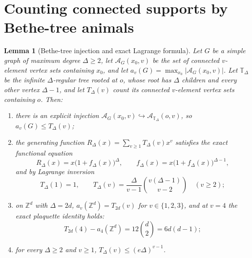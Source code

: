 \documentclass[11pt]{article}
\theoremstyle{plain}
\newtheorem{lemma}{Lemma}
\theoremstyle{definition}
\begin{document}
\section{Counting connected supports by Bethe-tree animals}\label{sec:animals}

\begin{lemma}[Bethe-tree injection and exact Lagrange formula]\label{lem:animals}
Let $G$ be a simple graph of maximum degree $\Delta\ge2$, let
$\mathcal A_G(x_0,v)$ be the set of connected $v$-element vertex sets containing
$x_0$, and let $a_v(G)=\max_{x_0}|\mathcal A_G(x_0,v)|$. Let $\mathbb T_\Delta$ be
the infinite $\Delta$-regular tree rooted at $o$, whose root has $\Delta$ children and
every other vertex $\Delta-1$, and let $T_\Delta(v)$ count its connected $v$-element
vertex sets containing $o$. Then:
\begin{enumerate}
\item there is an explicit injection $\mathcal A_G(x_0,v)\hookrightarrow
 \mathcal A_{\mathbb T_\Delta}(o,v)$, so $a_v(G)\le T_\Delta(v)$;
\item the generating function $R_\Delta(x)=\sum_{v\ge1}T_\Delta(v)x^v$ satisfies the
 exact functional equation
 \begin{equation}\label{eq:functional}
 R_\Delta(x)=x\bigl(1+f_\Delta(x)\bigr)^\Delta,\qquad
 f_\Delta(x)=x\bigl(1+f_\Delta(x)\bigr)^{\Delta-1},
 \end{equation}
 and by Lagrange inversion
\begin{equation}\label{eq:lagrange}
 T_\Delta(1)=1,\qquad T_\Delta(v)=\frac{\Delta}{v-1}\binom{v(\Delta-1)}{v-2}
 \quad(v\ge2);
\end{equation}
\item on $\mathbb Z^d$ with $\Delta=2d$, $a_v(\mathbb Z^d)=T_{2d}(v)$ for
 $v\in\{1,2,3\}$, and at $v=4$ the exact plaquette identity holds:
\begin{equation}\label{eq:plaquette}
 T_{2d}(4)-a_4(\mathbb Z^d)=12\binom d2=6d(d-1);
\end{equation}
\item for every $\Delta\ge2$ and $v\ge1$, $T_\Delta(v)\le(e\Delta)^{v-1}$.
\end{enumerate}
\end{lemma}
\end{document}
